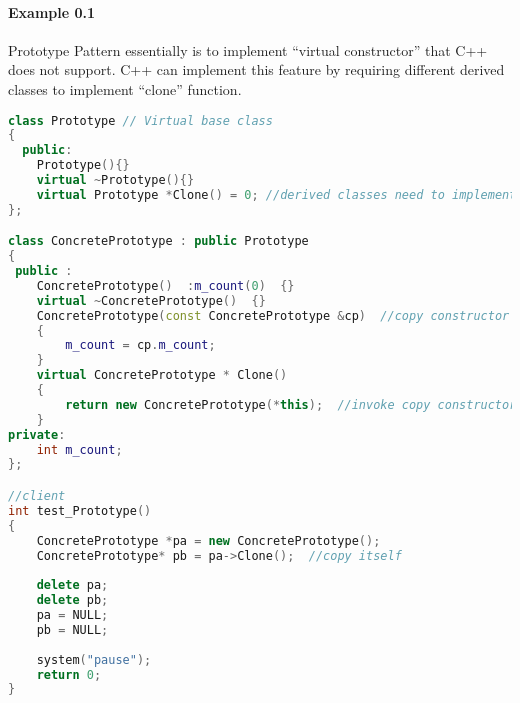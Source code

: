 \documentclass{book}
\begin{document}
\paragraph{Example 0.1} Prototype Pattern essentially is to implement ``virtual constructor'' that C++ does not support. C++ can implement this feature by requiring
different derived classes to implement ``clone'' function.
\begin{lstlisting}[caption={Prototype Pattern sample 0.1},language=C++]
class Prototype // Virtual base class 
{  
  public:  
    Prototype(){}  
    virtual ~Prototype(){}  
    virtual Prototype *Clone() = 0; //derived classes need to implement it 
};  

class ConcretePrototype : public Prototype  
{  
 public :  
    ConcretePrototype()  :m_count(0)  {}  
    virtual ~ConcretePrototype()  {}   
    ConcretePrototype(const ConcretePrototype &cp)  //copy constructor
    {  
        m_count = cp.m_count;  
    }  
    virtual ConcretePrototype * Clone()  
    {  
        return new ConcretePrototype(*this);  //invoke copy constructor
    }  
private:  
    int m_count;  
};  

//client
int test_Prototype()  
{  
    ConcretePrototype *pa = new ConcretePrototype();  
    ConcretePrototype* pb = pa->Clone();  //copy itself
  
    delete pa;  
    delete pb;  
    pa = NULL;  
    pb = NULL;  
  
    system("pause");  
    return 0;  
}  
\end{lstlisting}
\end{document}
